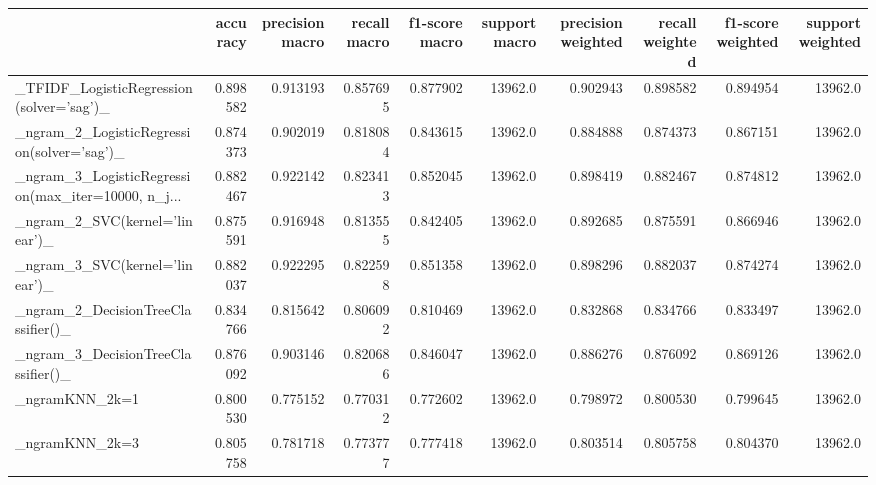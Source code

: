 \begin{tabular}{lrrrrrrrrr}
\toprule
{} &  accuracy &  precision macro &  recall macro &  f1-score macro &  support macro &  precision weighted &  recall weighted &  f1-score weighted &  support weighted \\
\midrule
\_TFIDF\_LogisticRegression(solver='sag')\_           &  0.898582 &         0.913193 &      0.857695 &        0.877902 &        13962.0 &            0.902943 &         0.898582 &           0.894954 &           13962.0 \\
\_ngram\_2\_LogisticRegression(solver='sag')\_         &  0.874373 &         0.902019 &      0.818084 &        0.843615 &        13962.0 &            0.884888 &         0.874373 &           0.867151 &           13962.0 \\
\_ngram\_3\_LogisticRegression(max\_iter=10000, n\_j... &  0.882467 &         0.922142 &      0.823413 &        0.852045 &        13962.0 &            0.898419 &         0.882467 &           0.874812 &           13962.0 \\
\_ngram\_2\_SVC(kernel='linear')\_                     &  0.875591 &         0.916948 &      0.813555 &        0.842405 &        13962.0 &            0.892685 &         0.875591 &           0.866946 &           13962.0 \\
\_ngram\_3\_SVC(kernel='linear')\_                     &  0.882037 &         0.922295 &      0.822598 &        0.851358 &        13962.0 &            0.898296 &         0.882037 &           0.874274 &           13962.0 \\
\_ngram\_2\_DecisionTreeClassifier()\_                 &  0.834766 &         0.815642 &      0.806092 &        0.810469 &        13962.0 &            0.832868 &         0.834766 &           0.833497 &           13962.0 \\
\_ngram\_3\_DecisionTreeClassifier()\_                 &  0.876092 &         0.903146 &      0.820686 &        0.846047 &        13962.0 &            0.886276 &         0.876092 &           0.869126 &           13962.0 \\
\_ngramKNN\_2k=1                                     &  0.800530 &         0.775152 &      0.770312 &        0.772602 &        13962.0 &            0.798972 &         0.800530 &           0.799645 &           13962.0 \\
\_ngramKNN\_2k=3                                     &  0.805758 &         0.781718 &      0.773777 &        0.777418 &        13962.0 &            0.803514 &         0.805758 &           0.804370 &           13962.0 \\

\end{tabular}
